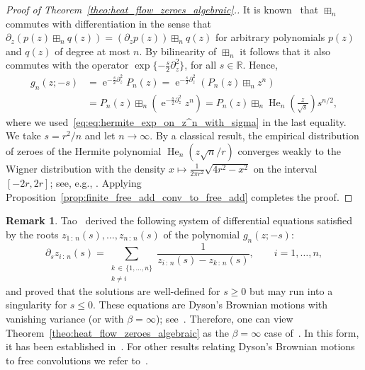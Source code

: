 \documentclass[10pt]{amsart}
\theoremstyle{definition}\newtheorem{defi}[theo]{Definition}\newtheorem{rema}[theo]{Remark}\newtheorem{exam}[theo]{Example}\newtheorem{exem}[theo]{Example}\newtheorem{nota}[theo]{Notation}
\DeclareMathOperator*{\He}{He}
\DeclareMathOperator{\eee}{e}
\newcommand{\R}{\mathbb{R}}
\begin{document}
\begin{proof}[Proof of Theorem~\ref{theo:heat_flow_zeroes_algebraic}.]
It is known~\cite{marcus_spielman_srivastava} that $\boxplus_n$ commutes with differentiation in the sense that $\partial_z (p(z) \boxplus_n q(z))= (\partial_z p(z)) \boxplus_n q(z)$ for arbitrary polynomials $p(z)$ and $q(z)$ of degree at most $n$. By bilinearity of $\boxplus_n$ it follows that it also commutes with the operator $\exp\{-\frac s2 \partial_z^2\}$, for all $s\in \R$. Hence,
\begin{align*}
g_{n} (z; -s) & =
\eee^{-\frac s2 \partial_z^2} P_{n}(z) =
\eee^{-\frac s2 \partial_z^2} \left(P_{n} (z) \boxplus_n z^n \right)\\
&= P_{n}(z)\boxplus_n \left(\eee^{-\frac s2 \partial_z^2} z^n\right) = P_n(z) \boxplus_n \He\nolimits_n\left(\frac{z}{\sqrt s}\right) s^{n/2},
\end{align*}
where we used~\eqref{eq:eq:hermite_exp_on_z^n_with_sigma} in the last equality. We take $s = r^2/ n$ and let $n\to\infty$. By a classical result, the empirical distribution of zeroes of the Hermite polynomial $\He_n(z\sqrt {n}/r)$ converges weakly to the Wigner distribution with the density $x\mapsto \frac 1 {2\pi r^2} \sqrt{4r^2-x^2}$ on the interval $[-2r,2r]$; see, e.g., \cite{gawronski,kornyik_michaletzky,ullman0}. Applying Proposition~\ref{prop:finite_free_add_conv_to_free_add} completes the proof.
\end{proof}


\begin{rema}
Tao~\cite{tao_blog1} derived the following system of differential equations satisfied by the roots $z_{1\,:\,n}(s),\ldots, z_{n\,:\,n}(s)$ of the polynomial $g_n(z; -s)$:
\begin{equation}\label{eq:dyson_without_noise}
\partial_s z_{i\,:\,n} (s) = \sum_{\substack{k\,\in\,\{1,\ldots, n\}\\ k\neq i}} \frac{1}{z_{i\,:\,n}(s) - z_{k\,:\,n}(s)},
\qquad i=1,\ldots, n,
\end{equation}
and proved that the solutions are well-defined for $s\geq 0$ but may run into a singularity for $s\leq 0$. These equations are Dyson's Brownian motions with vanishing variance (or with $\beta= \infty$); see~\cite[Theorem~4.3.2]{anderson_etal_book}. Therefore, one can view Theorem~\ref{theo:heat_flow_zeroes_algebraic} as the $\beta= \infty$ case of~\cite[Proposition~4.3.10]{anderson_etal_book}. In this form, it has been established in~\cite[Theorem~1.1]{voit_werner2}. For other results relating Dyson's Brownian motions to free convolutions we refer to~\cite{andraus2012,dumitriu_edelman_large_beta,gorin_kleptsyn,voit_woerner1,voit_werner2}.
\end{rema}
\end{document}
